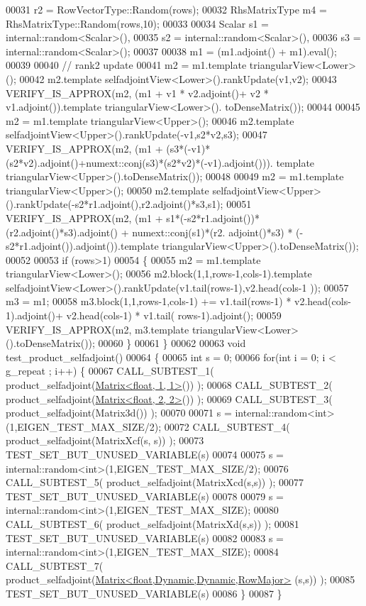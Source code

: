 \begin{DoxyCode}
00031                 r2 = RowVectorType::Random(rows);
00032   RhsMatrixType m4 = RhsMatrixType::Random(rows,10);
00033 
00034   Scalar s1 = internal::random<Scalar>(),
00035          s2 = internal::random<Scalar>(),
00036          s3 = internal::random<Scalar>();
00037 
00038   m1 = (m1.adjoint() + m1).eval();
00039 
00040   \textcolor{comment}{// rank2 update}
00041   m2 = m1.template triangularView<Lower>();
00042   m2.template selfadjointView<Lower>().rankUpdate(v1,v2);
00043   VERIFY\_IS\_APPROX(m2, (m1 + v1 * v2.adjoint()+ v2 * v1.adjoint()).\textcolor{keyword}{template} triangularView<Lower>().
      toDenseMatrix());
00044 
00045   m2 = m1.template triangularView<Upper>();
00046   m2.template selfadjointView<Upper>().rankUpdate(-v1,s2*v2,s3);
00047   VERIFY\_IS\_APPROX(m2, (m1 + (s3*(-v1)*(s2*v2).adjoint()+numext::conj(s3)*(s2*v2)*(-v1).adjoint())).\textcolor{keyword}{
      template} triangularView<Upper>().toDenseMatrix());
00048 
00049   m2 = m1.template triangularView<Upper>();
00050   m2.template selfadjointView<Upper>().rankUpdate(-s2*r1.adjoint(),r2.adjoint()*s3,s1);
00051   VERIFY\_IS\_APPROX(m2, (m1 + s1*(-s2*r1.adjoint())*(r2.adjoint()*s3).adjoint() + numext::conj(s1)*(r2.
      adjoint()*s3) * (-s2*r1.adjoint()).adjoint()).\textcolor{keyword}{template} triangularView<Upper>().toDenseMatrix());
00052 
00053   \textcolor{keywordflow}{if} (rows>1)
00054   \{
00055     m2 = m1.template triangularView<Lower>();
00056     m2.block(1,1,rows-1,cols-1).template selfadjointView<Lower>().rankUpdate(v1.tail(rows-1),v2.head(cols-1
      ));
00057     m3 = m1;
00058     m3.block(1,1,rows-1,cols-1) += v1.tail(rows-1) * v2.head(cols-1).adjoint()+ v2.head(cols-1) * v1.tail(
      rows-1).adjoint();
00059     VERIFY\_IS\_APPROX(m2, m3.template triangularView<Lower>().toDenseMatrix());
00060   \}
00061 \}
00062 
00063 \textcolor{keywordtype}{void} test\_product\_selfadjoint()
00064 \{
00065   \textcolor{keywordtype}{int} s = 0;
00066   \textcolor{keywordflow}{for}(\textcolor{keywordtype}{int} i = 0; i < g\_repeat ; i++) \{
00067     CALL\_SUBTEST\_1( product\_selfadjoint(\hyperlink{group___core___module_class_eigen_1_1_matrix}{Matrix<float, 1, 1>}()) );
00068     CALL\_SUBTEST\_2( product\_selfadjoint(\hyperlink{group___core___module_class_eigen_1_1_matrix}{Matrix<float, 2, 2>}()) );
00069     CALL\_SUBTEST\_3( product\_selfadjoint(Matrix3d()) );
00070     
00071     s = internal::random<int>(1,EIGEN\_TEST\_MAX\_SIZE/2);
00072     CALL\_SUBTEST\_4( product\_selfadjoint(MatrixXcf(s, s)) );
00073     TEST\_SET\_BUT\_UNUSED\_VARIABLE(s)
00074     
00075     s = internal::random<int>(1,EIGEN\_TEST\_MAX\_SIZE/2);
00076     CALL\_SUBTEST\_5( product\_selfadjoint(MatrixXcd(s,s)) );
00077     TEST\_SET\_BUT\_UNUSED\_VARIABLE(s)
00078     
00079     s = internal::random<int>(1,EIGEN\_TEST\_MAX\_SIZE);
00080     CALL\_SUBTEST\_6( product\_selfadjoint(MatrixXd(s,s)) );
00081     TEST\_SET\_BUT\_UNUSED\_VARIABLE(s)
00082     
00083     s = internal::random<int>(1,EIGEN\_TEST\_MAX\_SIZE);
00084     CALL\_SUBTEST\_7( product\_selfadjoint(\hyperlink{group___core___module_class_eigen_1_1_matrix}{Matrix<float,Dynamic,Dynamic,RowMajor>}
      (s,s)) );
00085     TEST\_SET\_BUT\_UNUSED\_VARIABLE(s)
00086   \}
00087 \}
\end{DoxyCode}
